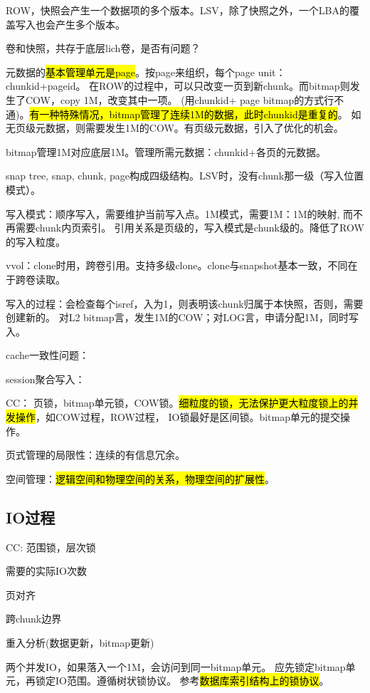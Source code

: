 ROW，快照会产生一个数据项的多个版本。LSV，除了快照之外，一个LBA的覆盖写入也会产生多个版本。

卷和快照，共存于底层lich卷，是否有问题？

元数据的\hl{基本管理单元是page}。按page来组织，每个page unit：chunkid+pageid。
在ROW的过程中，可以只改变一页到新chunk。而bitmap则发生了COW，copy 1M，改变其中一项。
(用chunkid+ page bitmap的方式行不通)。\hl{有一种特殊情况，bitmap管理了连续1M的数据，此时chunkid是重复的}。
如无页级元数据，则需要发生1M的COW。有页级元数据，引入了优化的机会。

bitmap管理1M对应底层1M。管理所需元数据：chunkid+各页的元数据。

snap tree, snap, chunk, page构成四级结构。LSV时，没有chunk那一级（写入位置模式）。

写入模式：顺序写入，需要维护当前写入点。1M模式，需要1M：1M的映射, 而不再需要chunk内页索引。
引用关系是页级的，写入模式是chunk级的。降低了ROW的写入粒度。

vvol：clone时用，跨卷引用。支持多级clone。clone与snapshot基本一致，不同在于跨卷读取。

写入的过程：会检查每个isref，入为1，则表明该chunk归属于本快照，否则，需要创建新的。
对L2 bitmap言，发生1M的COW；对LOG言，申请分配1M，同时写入。

cache一致性问题：

session聚合写入：

CC： 页锁，bitmap单元锁，COW锁。\hl{细粒度的锁，无法保护更大粒度锁上的并发操作}，如COW过程，ROW过程，
IO锁最好是区间锁。bitmap单元的提交操作。

页式管理的局限性：连续的有信息冗余。

空间管理：\hl{逻辑空间和物理空间的关系，物理空间的扩展性}。

\subsection{IO过程}

\begin{itembox}
\item CC: 范围锁，层次锁
\item 需要的实际IO次数
\item 页对齐
\item 跨chunk边界
\item 重入分析(数据更新，bitmap更新)
\end{itembox}

两个并发IO，如果落入一个1M，会访问到同一bitmap单元。
应先锁定bitmap单元，再锁定IO范围。遵循树状锁协议。
参考\hl{数据库索引结构上的锁协议}。

